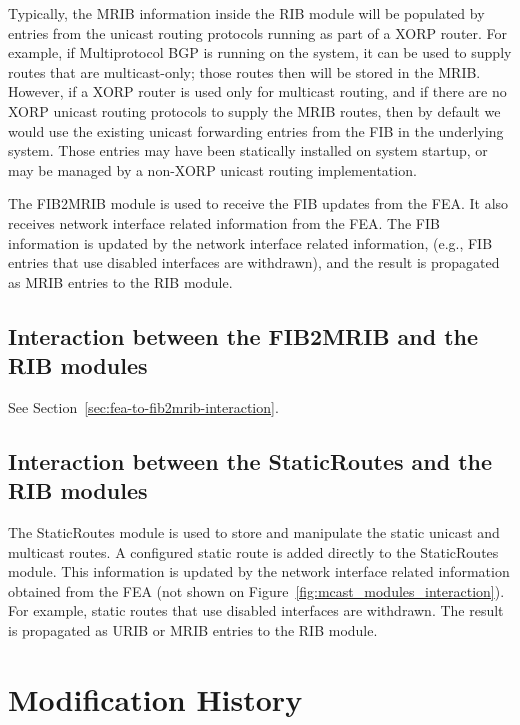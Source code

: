 \documentclass[11pt]{article}
\begin{document}
Typically, the MRIB information inside the RIB module will be populated by
entries from the unicast routing protocols running as part of a XORP
router. For example, if Multiprotocol BGP is running on the system, it can be
used to supply routes that are multicast-only; those routes then will be
stored in the MRIB. However, if a XORP router is used only for multicast
routing, and if there are no XORP unicast routing protocols to supply the MRIB
routes, then by default we would use the existing unicast forwarding
entries from the FIB in the underlying system. Those entries may have been
statically installed on system startup, or may be managed by a non-XORP
unicast routing implementation.

The FIB2MRIB module is used to receive the FIB updates from the FEA.
It also receives network interface related information from the FEA.
The FIB information is updated by the network interface related information,
(e.g., FIB entries that use disabled interfaces are withdrawn),
and the result is propagated as MRIB entries to the RIB module.

\subsection{Interaction between the FIB2MRIB and the RIB modules}

See Section~\ref{sec:fea-to-fib2mrib-interaction}.

\subsection{Interaction between the StaticRoutes and the RIB modules}

The StaticRoutes module is used to store and manipulate the static unicast and
multicast routes. A configured static route is added directly to the
StaticRoutes module. This information is updated by the network interface
related information obtained from the FEA (not shown on
Figure~\ref{fig:mcast_modules_interaction}). For example, static routes
that use disabled interfaces are withdrawn. The result is propagated
as URIB or MRIB entries to the RIB module.


\appendix
\section{Modification History}
\end{document}
